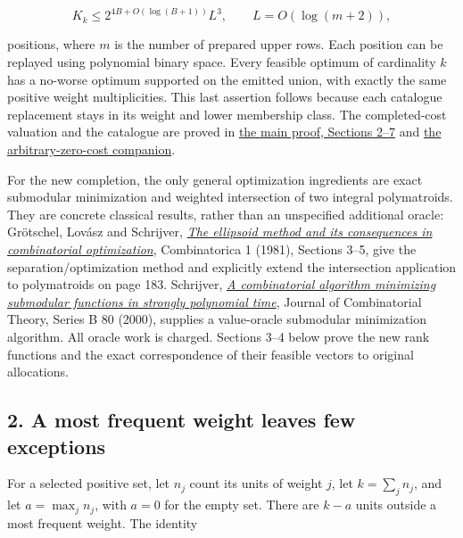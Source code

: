\[
K_k\le 2^{4B+O(\log(B+1))}L^3,
\qquad L=O(\log(m+2)),
\tag{DW3}
\]

positions, where \(m\) is the number of prepared upper rows. Each position can be replayed using polynomial binary space. Every feasible optimum of cardinality \(k\) has a no-worse optimum supported on the emitted union, with exactly the same positive weight multiplicities. This last assertion follows because each catalogue replacement stays in its weight and lower membership class. The completed-cost valuation and the catalogue are proved in \href{https://github.com/icekylinx/algorithm-frontier/blob/main/problems/weighted-prefix-quota-frontier/proof.md}{the main proof, Sections 2--7} and \href{https://github.com/icekylinx/algorithm-frontier/blob/main/problems/weighted-prefix-quota-frontier/manuscripts/laminar-valuated-zero-completion-fpt.md}{the arbitrary-zero-cost companion}.

For the new completion, the only general optimization ingredients are exact submodular minimization and weighted intersection of two integral polymatroids. They are concrete classical results, rather than an unspecified additional oracle: Grötschel, Lovász and Schrijver, \href{https://ir.cwi.nl/pub/10046/10046D.pdf}{\emph{The ellipsoid method and its consequences in combinatorial optimization}}, Combinatorica 1 (1981), Sections 3--5, give the separation/optimization method and explicitly extend the intersection application to polymatroids on page 183. Schrijver, \href{https://homepages.cwi.nl/~lex/files/minsubm6.pdf}{\emph{A combinatorial algorithm minimizing submodular functions in strongly polynomial time}}, Journal of Combinatorial Theory, Series B 80 (2000), supplies a value-oracle submodular minimization algorithm. All oracle work is charged. Sections 3--4 below prove the new rank functions and the exact correspondence of their feasible vectors to original allocations.

\hypertarget{af-fe230a140d-a-most-frequent-weight-leaves-few-exceptions}{%
\subsection{2. A most frequent weight leaves few exceptions}\label{af-fe230a140d-a-most-frequent-weight-leaves-few-exceptions}}

For a selected positive set, let \(n_j\) count its units of weight \(j\), let \(k=\sum_j n_j\), and let \(a=\max_j n_j\), with \(a=0\) for the empty set. There are \(k-a\) units outside a most frequent weight. The identity

